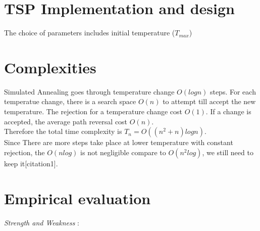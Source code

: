 \documentclass[12pt]{article}
\begin{document}
\section{TSP Implementation and design}
The choice of parameters includes initial temperature ($T_{max}$)



\section{Complexities}
Simulated Annealing goes through temperature change $O(logn)$ steps. For each temperatue change, there is a search space $O(n)$ to attempt till accept the new temperature. The rejection for a temperature change cost $O(1)$. If a change is accepted, the average path reversal cost $O(n)$. \\

Therefore the total time complexity is $T_n = O((n^2 + n) log n)$. \\

Since There are more steps take place at lower temperature with constant rejection, the $O(nlog)$ is not negligible compare to $O(n^2log)$, we still need to keep it[citation1]. 



\section{Empirical evaluation}
\textit{Strength and Weakness} : \\
\end{document}
